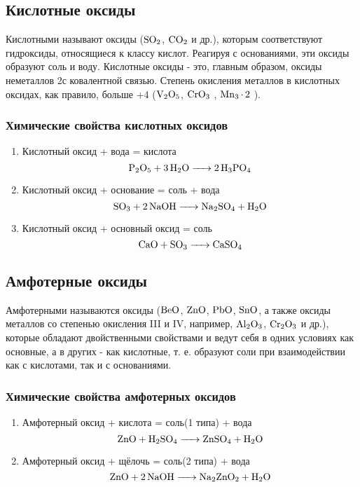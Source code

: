 \subsection{Кислотные оксиды}
Кислотными называют оксиды ($\ce{SO2}$, $\ce{CO2}$ и др.), которым соответствуют
гидроксиды, относящиеся к классу кислот. Реагируя с основаниями, эти оксиды
образуют соль и воду. Кислотные оксиды - это, главным образом, оксиды неметаллов
2с ковалентной связью. Степень окисления металлов в кислотных оксидах, как
правило, больше +4 ($\ce{V2O5}$, $\ce{CrO3}$ , $\ce{Mn3.2}$ ).

\subsubsection{Химические свойства кислотных оксидов}

\begin{enumerate}
    \item Кислотный оксид + вода = кислота
        $$\ce{P2O5 + 3H2O -> 2H3PO4}$$

    \item Кислотный оксид + основание = соль + вода
        $$\ce{SO3 + 2NaOH -> Na2SO4 + H2O}$$

    \item Кислотный оксид + основный оксид = соль
        $$\ce{CaO + SO3 -> CaSO4}$$
\end{enumerate}

\subsection{Амфотерные оксиды}%
\label{sec:}

Амфотерными называются оксиды ($\ce{BeO}$, $\ce{ZnO}$, $\ce{PbO}$, $\ce{SnO}$, а также оксиды
металлов со степенью окисления III и IV, например, $\ce{Al2O3}$, $\ce{Cr2O3}$ и др.), которые
обладают двойственными свойствами и ведут себя в одних условиях как основные, а
в других - как кислотные, т. е. образуют соли при взаимодействии как с кислотами,
так и с основаниями.

\subsubsection{Химические свойства амфотерных оксидов}

\begin{enumerate}
    \item Амфотерный оксид + кислота = соль(1 типа) + вода
        $$\ce{ZnO + H2SO4 -> ZnSO4 + H2O}$$

    \item Амфотерный оксид + щёлочь = соль(2 типа) + вода
        $$\ce{ZnO + 2NaOH -> Na2ZnO2 + H2O}$$
\end{enumerate}


